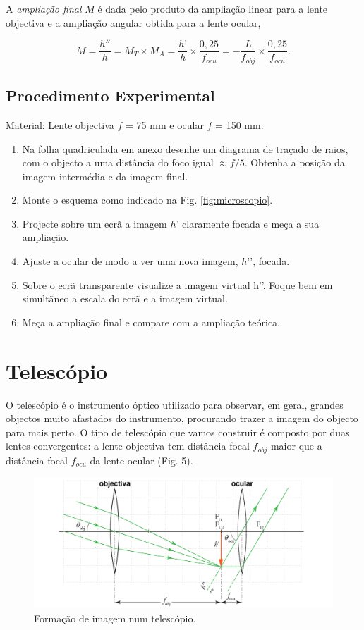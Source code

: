 \documentclass[a4paper,12pt]{article}      %
\begin{document}
A \emph{ampliação final} $M$ é dada pelo produto da ampliação linear para a lente objectiva e a ampliação angular obtida para a lente ocular,

\begin{equation}
M = \frac{h''}{h}=M_T\times M_A =\frac{h’}{h}\times\frac{0,25}{f_{ocu}}=-\frac{L}{f_{obj}}\times\frac{0,25}{f_{ocu}}.
\end{equation}


\subsection{\sf Procedimento Experimental}

Material: Lente objectiva $f$ = 75 mm e ocular $f$ = 150 mm.

\begin{enumerate}
\item Na folha quadriculada em anexo desenhe um diagrama de traçado de raios, com o objecto a uma distância do foco igual $\approx f/5$. Obtenha a posição da imagem intermédia e da imagem final.
\item Monte o esquema como indicado na Fig. \ref{fig:microscopio}.
\item Projecte sobre um ecrã a imagem $h’$ claramente focada e meça a sua ampliação.
\item Ajuste a ocular de modo a ver uma nova imagem, $h’’$, focada.
\item Sobre o ecrã transparente visualize a imagem virtual h’’. Foque bem em simultãneo a escala do ecrã e a imagem virtual.
\item Meça a ampliação final e compare com a ampliação teórica.
\end{enumerate}

\section {\sf Telescópio}
O telescópio é o instrumento óptico utilizado para observar, em geral, grandes objectos muito afastados do instrumento, procurando trazer a imagem do objecto para mais perto. O tipo de telescópio que vamos construir é composto por duas lentes convergentes: a lente objectiva tem distância focal $f_{obj}$ maior que a distância focal $f_{ocu}$ da lente ocular (Fig. 5).

\begin{figure}
	[!htb]  \centering 
	\includegraphics[width=1.0\textwidth]{telescopio2}
		\caption{Formação de imagem num telescópio. \label{fig:telescopio2}} 
\end{figure}
\end{document}
